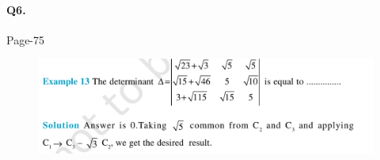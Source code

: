 \documentclass{article}
\begin{document}
\paragraph{Q6.}
\begin{flushright}
Page-75
\end{flushright}

\begin{figure}[H]
    \includegraphics[scale=0.5]{determinants_l2_ps_6.png}
\end{figure}
\clearpage


\end{document}
